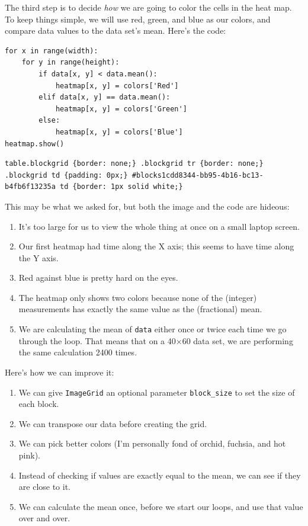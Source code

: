 \documentclass[]{book}
\begin{document}
The third step is to decide \emph{how} we are going to color the cells
in the heat map. To keep things simple, we will use red, green, and blue
as our colors, and compare data values to the data set's mean. Here's
the code:

\begin{verbatim}
for x in range(width):
    for y in range(height):
        if data[x, y] < data.mean():
            heatmap[x, y] = colors['Red']
        elif data[x, y] == data.mean():
            heatmap[x, y] = colors['Green']
        else:
            heatmap[x, y] = colors['Blue']
heatmap.show()
\end{verbatim}

\begin{verbatim}
table.blockgrid {border: none;} .blockgrid tr {border: none;} .blockgrid td {padding: 0px;} #blocks1cdd8344-bb95-4b16-bc13-b4fb6f13235a td {border: 1px solid white;}
\end{verbatim}

This may be what we asked for, but both the image and the code are
hideous:

\begin{enumerate}
\item
  It's too large for us to view the whole thing at once on a small
  laptop screen.
\item
  Our first heatmap had time along the X axis; this seems to have time
  along the Y axis.
\item
  Red against blue is pretty hard on the eyes.
\item
  The heatmap only shows two colors because none of the (integer)
  measurements has exactly the same value as the (fractional) mean.
\item
  We are calculating the mean of \texttt{data} either once or twice each
  time we go through the loop. That means that on a 40×60 data set, we
  are performing the same calculation 2400 times.
\end{enumerate}

Here's how we can improve it:

\begin{enumerate}
\item
  We can give \texttt{ImageGrid} an optional parameter
  \texttt{block\_size} to set the size of each block.
\item
  We can transpose our data before creating the grid.
\item
  We can pick better colors (I'm personally fond of orchid, fuchsia, and
  hot pink).
\item
  Instead of checking if values are exactly equal to the mean, we can
  see if they are close to it.
\item
  We can calculate the mean once, before we start our loops, and use
  that value over and over.
\end{enumerate}
\end{document}
